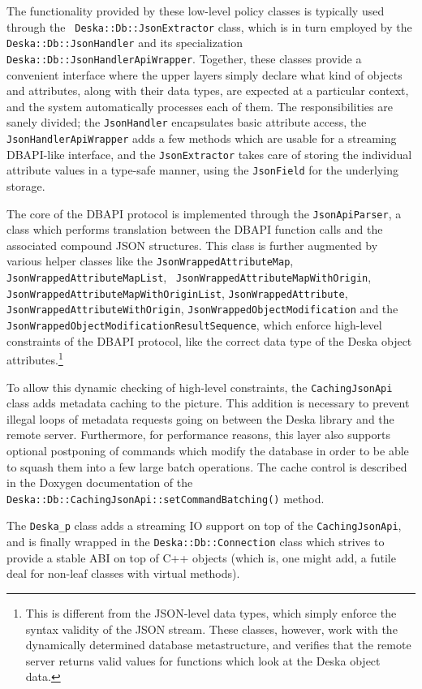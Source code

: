 \documentclass[deska]{subfiles}
\begin{document}
The functionality provided by these low-level policy classes is typically used through the {\tt
Deska::Db::JsonExtractor} class, which is in turn employed by the {\tt Deska::Db::JsonHandler} and its specialization
{\tt Deska::Db::JsonHandlerApiWrapper}.  Together, these classes provide a convenient interface where the upper layers
simply declare what kind of objects and attributes, along with their data types, are expected at a particular context,
and the system automatically processes each of them.  The responsibilities are sanely divided; the {\tt JsonHandler}
encapsulates basic attribute access, the {\tt JsonHandlerApiWrapper} adds a few methods which are usable for a streaming
DBAPI-like interface, and the {\tt JsonExtractor} takes care of storing the individual attribute values in a type-safe
manner, using the {\tt JsonField} for the underlying storage.

The core of the DBAPI protocol is implemented through the {\tt JsonApiParser}, a class which performs translation
between the DBAPI function calls and the associated compound JSON structures.  This class is further augmented by
various helper classes like the {\tt JsonWrappedAttributeMap}, {\tt JsonWrappedAttributeMapList}, {\tt
JsonWrappedAttributeMapWithOrigin}, {\tt JsonWrappedAttributeMapWithOriginList}, {\tt JsonWrappedAttribute}, {\tt
JsonWrappedAttributeWithOrigin}, {\tt JsonWrappedObjectModification} and the {\tt
JsonWrappedObjectModificationResultSequence}, which enforce high-level constraints of the DBAPI protocol, like the
correct data type of the Deska object attributes.\footnote{This is different from the JSON-level data types, which simply
enforce the syntax validity of the JSON stream.  These classes, however, work with the dynamically determined database
metastructure, and verifies that the remote server returns valid values for functions which look at the Deska object
data.}

To allow this dynamic checking of high-level constraints, the {\tt CachingJsonApi} class adds metadata caching to the
picture.  This addition is necessary to prevent illegal loops of metadata requests going on between the Deska library
and the remote server.  Furthermore, for performance reasons, this layer also supports optional postponing of commands
which modify the database in order to be able to squash them into a few large batch operations.  The cache control is
described in the Doxygen documentation of the {\tt Deska::Db::CachingJsonApi::setCommandBatching()} method.

The {\tt Deska\_p} class adds a streaming IO support on top of the {\tt CachingJsonApi}, and is finally wrapped in the
{\tt Deska::Db::Connection} class which strives to provide a stable ABI on top of C++ objects (which is, one might add,
a futile deal for non-leaf classes with virtual methods).
\end{document}

